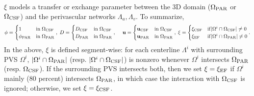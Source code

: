 \documentclass[fleqn,10pt]{wlscirep}
\begin{document}
 $\xi$ models a transfer or exchange parameter between the 3D domain ($\Omega_{\rm PAR}$ or $\Omega_{\rm CSF}$) and the perivascular networks $\Lambda_a, \Lambda_v$. To summarize,
\begin{equation*}
\phi =  \begin{cases}
  1  & \mathrm{in} \;  \Omega_{\rm{CSF}} \\ 
  \phi_{\rm{PAR}} & \mathrm{in} \; \Omega_{\rm{PAR}} 
  \end{cases}, \; 
D = \begin{cases}
  D_{\rm{CSF}} & \mathrm{in} \;  \Omega_{\rm{CSF}} \\ 
  D_{\rm{PAR}} & \mathrm{in} \; \Omega_{\rm{PAR}} \end{cases}, \; 
  \quad \mathbf{u}  = \begin{cases}
  \mathbf{u}_{\rm{CSF}} & \mathrm{in} \; \Omega_{\rm{CSF}} \\ 
  \mathbf{u}_{\rm{PAR}} & \mathrm{in} \; \Omega_{\rm{PAR}} 
\end{cases}, \; 
\xi = \begin{cases}
  \xi_{\rm{CSF}} & \mathrm{if} |\Omega^i \cap \Omega_{\rm{CSF}}| \neq 0 \\
  \xi_{\rm{EF}} & \mathrm{if} |\Omega^i \cap \Omega_{\rm{PAR}}| \neq 0  
\end{cases} . 
\end{equation*}
In the above, $\xi$ is defined segment-wise: for each centerline $\Lambda^i$ with surrounding PVS $\Omega^i$, $|\Omega^i \cap \Omega_{\rm{PAR}}|$ (resp. $|\Omega^i \cap \Omega_{\rm{CSF}}|$) is nonzero whenever $\Omega^i$ intersects $\Omega_{\rm{PAR}}$ (resp. $\Omega_{\rm{CSF}}$). If the surrounding PVS intersects both, then we set $\xi = \xi_{\rm EF}$ if $\Omega^i$ mainly ($80$ percent) intersects $\Omega_{\rm{PAR}}$, in which case the interaction with $\Omega_{\rm{CSF}}$ is ignored; otherwise, we set $\xi = \xi_{\rm CSF}$. 
 
\end{document}
